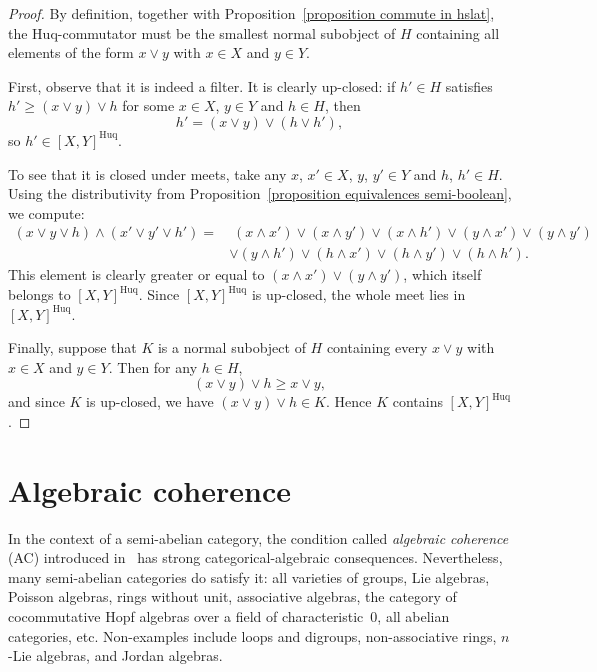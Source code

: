\documentclass[reqno,a4paper]{amsart}
\theoremstyle{remark}
\theoremstyle{definition}
\newcommand{\AC}{{\rm (AC)}}
\DeclareMathOperator{\Huq}{Huq}
\renewcommand{\geq}{\geqslant}
\begin{document}
\begin{proof}
	By definition, together with Proposition~\ref{proposition commute in hslat}, the Huq-commutator must be the smallest normal subobject of \(H\) containing all elements of the form \(x \vee y\) with \(x \in X\) and \(y \in Y\).

	First, observe that it is indeed a filter. It is clearly up-closed: if \(h' \in H\) satisfies \(h' \geq (x \vee y) \vee h\) for some \(x \in X\), \(y \in Y\) and \(h \in H\), then
	\[
		h' = (x \vee y) \vee (h \vee h'),
	\]
	so \(h' \in [X,Y]^{\Huq}\).

	To see that it is closed under meets, take any \(x\), \(x' \in X\), \(y\), \(y' \in Y\) and \(h\), \(h' \in H\). Using the distributivity from Proposition~\ref{proposition equivalences semi-boolean}, we compute:
	\begin{align*}
		(x \vee y \vee h) \wedge (x' \vee y' \vee h') =
		 & \;(x \wedge x') \vee (x \wedge y') \vee (x \wedge h') \vee (y \wedge x') \vee (y \wedge y') \\ & \vee (y \wedge h')
		\vee (h \wedge x') \vee (h \wedge y') \vee (h \wedge h').
	\end{align*}
	This element is clearly greater or equal to \((x \wedge x') \vee (y \wedge y')\), which itself belongs to \([X,Y]^{\Huq}\). Since \([X,Y]^{\Huq}\) is up-closed, the whole meet lies in \([X,Y]^{\Huq}\).

	Finally, suppose that \(K\) is a normal subobject of \(H\) containing every \(x \vee y\) with \(x \in X\) and \(y \in Y\). Then for any \(h \in H\),
	\[
		(x \vee y) \vee h \ge x \vee y,
	\]
	and since \(K\) is up-closed, we have \((x \vee y) \vee h \in K\). Hence \(K\) contains \([X,Y]^{\Huq}\).
\end{proof}






\section{Algebraic coherence}\label{section ac}

In the context of a semi-abelian category, the condition called \emph{algebraic coherence} \AC{} introduced in~\cite{acc} has strong categorical-algebraic consequences. Nevertheless, many semi-abelian categories do satisfy it: all varieties of groups, Lie algebras, Poisson algebras, rings without unit, associative algebras, the category of cocommutative Hopf algebras over a field of characteristic~0, all abelian categories, etc. Non-examples include loops and digroups, non-associative rings, \(n\)-Lie algebras, and Jordan algebras.
\end{document}
